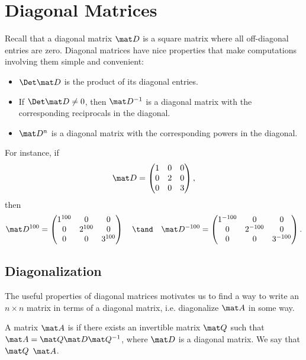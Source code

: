 \section{Diagonal Matrices}

Recall that a diagonal matrix $\mat D$ is a square matrix where all off-diagonal entries are zero. Diagonal matrices have nice properties that make computations involving them simple and convenient:
\begin{itemize}
    \item $\Det \mat D$ is the product of its diagonal entries.
    \item If $\Det \mat D \neq 0$, then $\mat D^{-1}$ is a diagonal matrix with the corresponding reciprocals in the diagonal.
    \item $\mat D^{n}$ is a diagonal matrix with the corresponding powers in the diagonal.
\end{itemize}
For instance, if \[\mat D = \begin{pmatrix}1 & 0 & 0 \\ 0 & 2 & 0 \\ 0 & 0 & 3\end{pmatrix},\] then \[\mat D^{100} = \begin{pmatrix}1^{100} & 0 & 0 \\ 0 & 2^{100} & 0 \\ 0 & 0 & 3^{100}\end{pmatrix} \quad \tand \quad \mat D^{-100} = \begin{pmatrix}1^{-100} & 0 & 0 \\ 0 & 2^{-100} & 0 \\ 0 & 0 & 3^{-100}\end{pmatrix}.\]

\subsection{Diagonalization}

The useful properties of diagonal matrices motivates us to find a way to write an $n \times n$ matrix in terms of a diagonal matrix, i.e. diagonalize $\mat A$ in some way.

\begin{definition}
    A matrix $\mat A$ is  if there exists an invertible matrix $\mat Q$ such that $\mat A = \mat Q \mat D \mat Q^{-1}$, where $\mat D$ is a diagonal matrix. We say that $\mat Q$  $\mat A$.
\end{definition}

